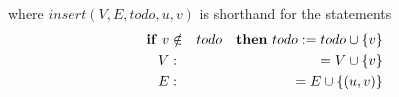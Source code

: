 where $insert(V,E,todo,u,v)$ is shorthand for the statements%
\begin{eqnarray*}
\text{\textbf{if} }v &\notin &todo\text{ \textbf{then} }todo:=todo\cup \{v\}
\\
V &:&=V\cup \{v\} \\
E &:&=E\cup \{(u,v)\}
\end{eqnarray*}
